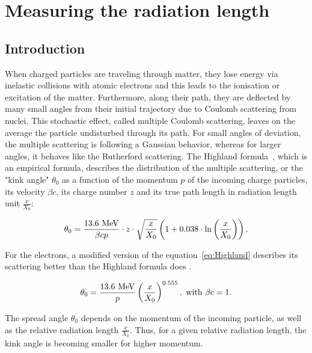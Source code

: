   \section{Measuring the radiation length}

    \subsection{Introduction}
    
    When charged particles are traveling through matter, they lose energy via inelastic collisions with atomic electrons and this leads to the ionisation or excitation of the matter.
    Furthermore, along their path, they are deflected by many small angles from their initial trajectory due to Coulomb scattering from nuclei. 
    This stochastic effect, called multiple Coulomb scattering, leaves on the average the particle undisturbed through its path. 
    For small angles of deviation, the multiple scattering is following a Gaussian behavior, whereas for larger angles, it behaves like the Rutherford scattering.
    The Highland formula~\cite{Highland:1975pq}, which is an empirical formula, describes the distribution of the multiple scattering, or the "kink angle" $\theta_0$ as a function of the momentum $p$ of the incoming charge particles, its velocity $\beta c$, its charge number $z$ and its true path length in radiation length unit $\frac{x}{X_{0}}$:

    \begin{equation}
      \theta_{0} = \frac{13.6~\rm{MeV}}{\beta c p}\cdot z \cdot \sqrt{\frac{x}{X_{0}}}\left(1 + 0.038 \cdot \ln{\left(\frac{x}{X_{0}}\right)}\right).
      \label{eq:Highland}
    \end{equation}

    For the electrons, a modified version of the equation~\ref{eq:Highland} describes its scattering better than the Highland formula does \cite{GEANT4}.

    \begin{equation}
      \theta_{0} = \frac{13.6~\rm{MeV}}{p}\left(\frac{x}{X_{0}}\right)^{0.555},~\text{with $\beta c = 1$.}
      \label{eq:theta0}
    \end{equation}

    The spread angle $\theta_{0}$ depends on the momentum of the incoming particle, as well as the relative radiation length $\frac{x}{X_{0}}$.
    Thus, for a given relative radiation length, the kink angle is becoming smaller for higher momentum.

